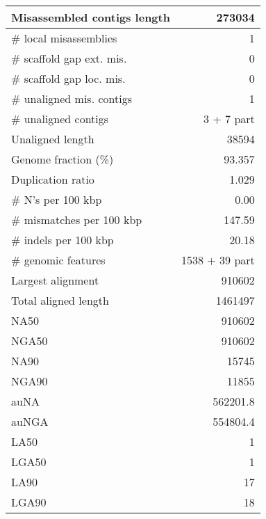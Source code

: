 \documentclass[12pt,a4paper]{article}
\begin{document}
\begin{table}[ht]
\begin{center}
\begin{tabular}{|l*{1}{|r}|}
Misassembled contigs length & 273034 \\ \hline
\# local misassemblies & 1 \\ \hline
\# scaffold gap ext. mis. & 0 \\ \hline
\# scaffold gap loc. mis. & 0 \\ \hline
\# unaligned mis. contigs & 1 \\ \hline
\# unaligned contigs & 3 + 7 part \\ \hline
Unaligned length & 38594 \\ \hline
Genome fraction (\%) & 93.357 \\ \hline
Duplication ratio & 1.029 \\ \hline
\# N's per 100 kbp & 0.00 \\ \hline
\# mismatches per 100 kbp & 147.59 \\ \hline
\# indels per 100 kbp & 20.18 \\ \hline
\# genomic features & 1538 + 39 part \\ \hline
Largest alignment & 910602 \\ \hline
Total aligned length & 1461497 \\ \hline
NA50 & 910602 \\ \hline
NGA50 & 910602 \\ \hline
NA90 & 15745 \\ \hline
NGA90 & 11855 \\ \hline
auNA & 562201.8 \\ \hline
auNGA & 554804.4 \\ \hline
LA50 & 1 \\ \hline
LGA50 & 1 \\ \hline
LA90 & 17 \\ \hline
LGA90 & 18 \\ \hline
\end{tabular}
\end{center}
\end{table}
\end{document}
